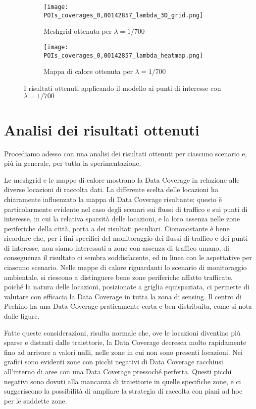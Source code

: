 \begin{figure}[H]
	\centering
	\begin{subfigure}[b]{\linewidth}
		\texttt{[image: POIs\_coverages\_0,00142857\_lambda\_3D\_grid.png]}
		\caption{Meshgrid ottenuta per $\lambda = 1/700$}
	\end{subfigure}
	\begin{subfigure}[b]{\linewidth}
		\texttt{[image: POIs\_coverages\_0,00142857\_lambda\_heatmap.png]}
		\caption{Mappa di calore ottenuta per $\lambda = 1/700$}
	\end{subfigure}
	\caption[Risultati POIs, $\lambda = 1/700$]{I risultati ottenuti applicando il modello ai punti di interesse con $\lambda = 1/700$}
	\label{fig:POIs_coverage3}
\end{figure}

\section{Analisi dei risultati ottenuti}

Procediamo adesso con una analisi dei risultati ottenuti per ciascuno scenario e, più in generale, per tutta la sperimentazione.

Le meshgrid e le mappe di calore mostrano la Data Coverage in relazione alle diverse locazioni di raccolta dati. 
La differente scelta delle locazioni ha chiaramente influenzato la mappa di Data Coverage risultante; questo è particolarmente evidente nel caso degli scenari sui flussi di traffico e sui punti di interesse, in cui la relativa sparsità delle locazioni, e la loro assenza nelle zone periferiche della città, porta a dei risultati peculiari.
Ciononostante è bene ricordare che, per i fini specifici del monitoraggio dei flussi di traffico e dei punti di interesse, non siamo interessati a zone con assenza di traffico umano, di conseguenza il risultato ci sembra soddisfacente, ed in linea con le aspettative per ciascuno scenario.
Nelle mappe di calore riguardanti lo scenario di monitoraggio ambientale, si riescono a distinguere bene zone periferiche affatto trafficate, poiché la natura delle locazioni, posizionate a griglia equispaziata, ci permette di valutare con efficacia la Data Coverage in tutta la zona di sensing. Il centro di Pechino ha una Data Coverage praticamente certa e ben distribuita, come si nota dalle figure. 

Fatte queste considerazioni, risulta normale che, ove le locazioni diventino più sparse e distanti dalle traiettorie, la Data Coverage decresca molto rapidamente fino ad arrivare a valori nulli, nelle zone in cui non sono presenti locazioni.
Nei grafici sono evidenti zone con picchi negativi di Data Coverage racchiusi all'interno di aree con una Data Coverage pressoché perfetta.
Questi picchi negativi sono dovuti alla mancanza di traiettorie in quelle specifiche zone, e ci suggeriscono la possibilità di ampliare la strategia di raccolta con piani ad hoc per le suddette zone.

